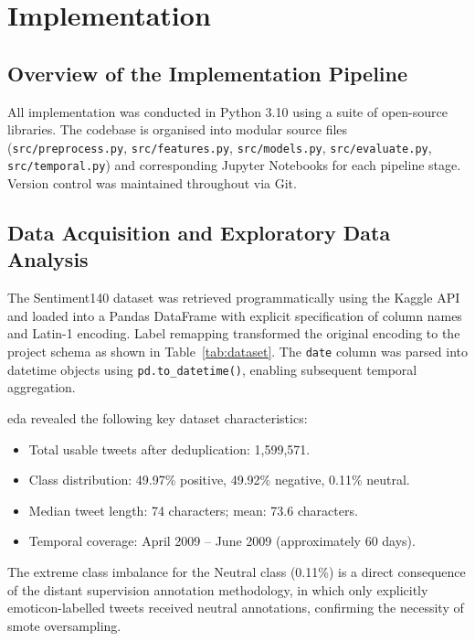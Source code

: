 \chapter{Implementation}
\label{ch:impl}

\section{Overview of the Implementation Pipeline}

All implementation was conducted in Python 3.10 using a suite of open-source libraries. The codebase is organised into modular source files (\texttt{src/preprocess.py}, \texttt{src/features.py}, \texttt{src/models.py}, \texttt{src/evaluate.py}, \texttt{src/temporal.py}) and corresponding Jupyter Notebooks for each pipeline stage. Version control was maintained throughout via Git.

\section{Data Acquisition and Exploratory Data Analysis}

The Sentiment140 dataset was retrieved programmatically using the Kaggle API and loaded into a Pandas DataFrame with explicit specification of column names and Latin-1 encoding. Label remapping transformed the original encoding to the project schema as shown in Table~\ref{tab:dataset}. The \texttt{date} column was parsed into datetime objects using \texttt{pd.to\_datetime()}, enabling subsequent temporal aggregation.

\gls{eda} revealed the following key dataset characteristics:
\begin{itemize}
  \item Total usable tweets after deduplication: 1,599,571.
  \item Class distribution: 49.97\% positive, 49.92\% negative, 0.11\% neutral.
  \item Median tweet length: 74 characters; mean: 73.6 characters.
  \item Temporal coverage: April 2009 -- June 2009 (approximately 60 days).
\end{itemize}

The extreme class imbalance for the Neutral class (0.11\%) is a direct consequence of the distant supervision annotation methodology, in which only explicitly emoticon-labelled tweets received neutral annotations, confirming the necessity of \gls{smote} oversampling.

